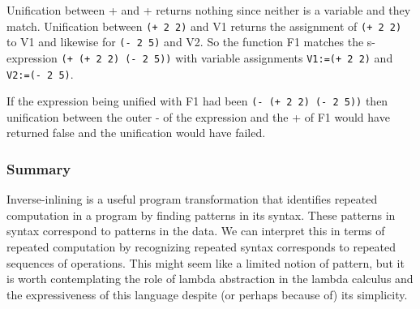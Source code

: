 \documentclass[a4paper,10pt]{article}
\begin{document}
Unification between + and + returns nothing since neither is a variable and they match.  Unification between \texttt{(+ 2 2)} and V1 returns the assignment of \texttt{(+ 2 2)} to V1 and likewise for \texttt{(- 2 5)} and V2.  So the function F1 matches the s-expression \texttt{(+ (+ 2 2) (- 2 5))} with variable assignments \texttt{V1:=(+ 2 2)} and \texttt{V2:=(- 2 5)}.

If the expression being unified with F1 had been \texttt{(- (+ 2 2) (- 2 5))} then unification between the outer - of the expression and the + of F1 would have returned false and the unification would have failed.

\subsubsection{Summary}
Inverse-inlining is a useful program transformation that identifies repeated computation in a program by finding patterns in its syntax.  These patterns in syntax correspond to patterns in the data.  We can interpret this in terms of repeated computation by recognizing repeated syntax corresponds to repeated sequences of operations.  This might seem like a limited notion of pattern, but it is worth contemplating the role of lambda abstraction in the lambda calculus and the expressiveness of this language despite (or perhaps because of) its simplicity.
\end{document}
